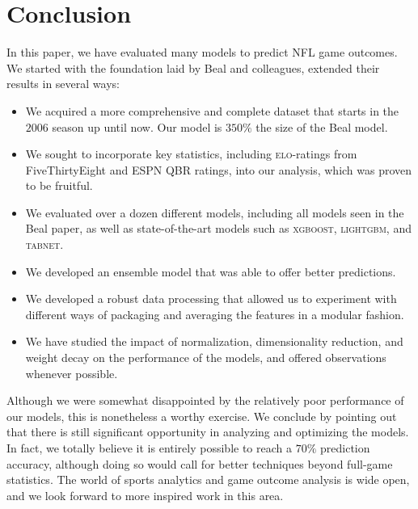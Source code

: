 \documentclass[10pt]{article}
\begin{document}
\section{Conclusion}

In this paper, we have evaluated many models to predict NFL game
outcomes. We started with the foundation laid by Beal and colleagues,
extended their results in several ways:

\begin{itemize}

\item We acquired a more comprehensive and complete dataset that
starts in the $2006$ season up until now.  Our model is $350\%$ the size of
the Beal model.

\item We sought to incorporate key statistics, including \textsc{elo}-ratings from
FiveThirtyEight and ESPN QBR ratings, into our analysis, which
was proven to be fruitful.

\item We evaluated over a dozen different models, including all
models seen in the Beal paper, as well as state-of-the-art models
such as \textsc{xgboost}, \textsc{lightgbm}, and \textsc{tabnet}.

\item We developed an ensemble model that was able to offer better
predictions.

\item We developed a robust data processing that allowed us to experiment
with different ways of packaging and averaging the features in
a modular fashion.

\item We have studied the impact of normalization, dimensionality
reduction, and weight decay on the performance of the models,
and offered observations whenever possible.

\end{itemize}

Although we were somewhat disappointed by the relatively poor performance of our models,
this is nonetheless a worthy exercise.
We conclude by pointing out that there is still significant
opportunity in analyzing and optimizing the models. In fact, we totally believe it is
entirely possible to reach a $70\%$ prediction accuracy, although doing so would call for
better techniques beyond full-game statistics.
The world of
sports analytics and game outcome analysis is wide open, and we look forward to 
more inspired work in this area.



\end{document}
